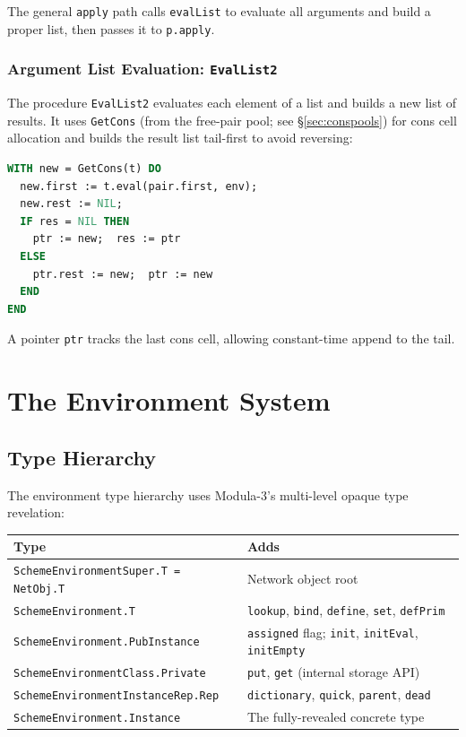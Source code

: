 \documentclass[12pt]{report}
\begin{document}
The general \texttt{apply} path calls \texttt{evalList} to evaluate
all arguments and build a proper list, then passes it to
\texttt{p.apply}.

\subsection{Argument List Evaluation: \texttt{EvalList2}}
\label{sec:evallist}

The procedure \texttt{EvalList2} evaluates each element of a list and
builds a new list of results.  It uses \texttt{GetCons} (from the
free-pair pool; see \S\ref{sec:conspools}) for cons cell allocation and
builds the result list tail-first to avoid reversing:

\begin{lstlisting}[language=Modula3]
WITH new = GetCons(t) DO
  new.first := t.eval(pair.first, env);
  new.rest := NIL;
  IF res = NIL THEN
    ptr := new;  res := ptr
  ELSE
    ptr.rest := new;  ptr := new
  END
END
\end{lstlisting}

A pointer \texttt{ptr} tracks the last cons cell, allowing constant-time
append to the tail.

\chapter{The Environment System}
\label{ch:env}

\section{Type Hierarchy}

The environment type hierarchy uses Modula-3's multi-level opaque type
revelation:

\begin{center}
\begin{tabular}{ll}
\toprule
\textbf{Type} & \textbf{Adds} \\
\midrule
\texttt{SchemeEnvironmentSuper.T = NetObj.T} & Network object root \\
\texttt{SchemeEnvironment.T} & \texttt{lookup}, \texttt{bind}, \texttt{define}, \texttt{set}, \texttt{defPrim} \\
\texttt{SchemeEnvironment.PubInstance} & \texttt{assigned} flag; \texttt{init}, \texttt{initEval}, \texttt{initEmpty} \\
\texttt{SchemeEnvironmentClass.Private} & \texttt{put}, \texttt{get} (internal storage API) \\
\texttt{SchemeEnvironmentInstanceRep.Rep} & \texttt{dictionary}, \texttt{quick}, \texttt{parent}, \texttt{dead} \\
\texttt{SchemeEnvironment.Instance} & The fully-revealed concrete type \\
\bottomrule
\end{tabular}
\end{center}
\end{document}
